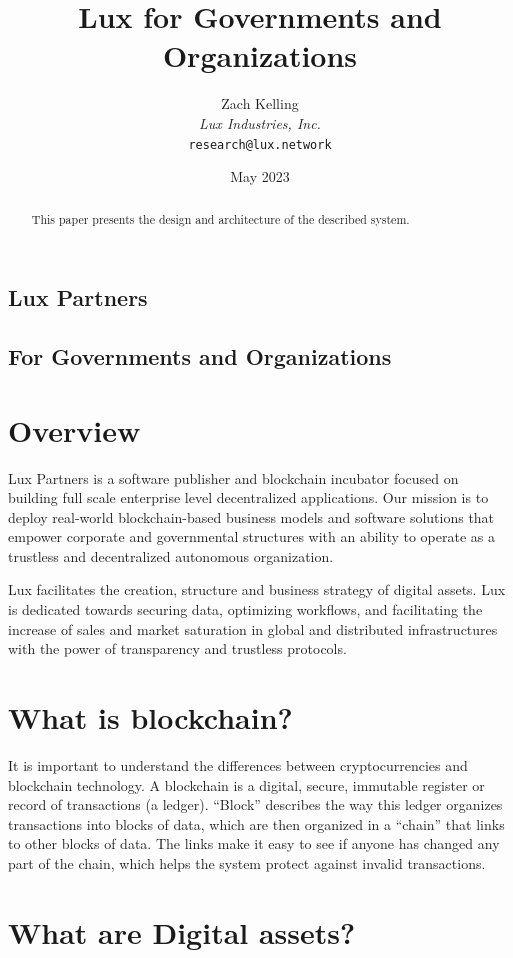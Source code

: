 \documentclass[11pt]{article}
\title{Lux for Governments and Organizations}
\author{Zach Kelling\\\textit{Lux Industries, Inc.}\\\texttt{research@lux.network}}
\date{May 2023}
\begin{document}
\luxcoverpage

\begin{abstract}
This paper presents the design and architecture of the described system.
\end{abstract}

\tableofcontents
\newpage


\subsection{Lux Partners}

\subsection{For Governments and Organizations}

\section{Overview}

Lux Partners is a software publisher and blockchain incubator focused on building full scale enterprise level decentralized applications. Our mission is to deploy real-world blockchain-based business models and software solutions that empower corporate and governmental structures with an ability to operate as a trustless and decentralized autonomous organization.


Lux facilitates the creation, structure and business strategy of digital assets. Lux  is dedicated towards securing data, optimizing workflows, and facilitating the increase of sales and market saturation in global and distributed infrastructures with the power of transparency and trustless protocols.


\section{What is blockchain?}

It is important to understand the differences between cryptocurrencies and blockchain technology. A blockchain is a digital, secure, immutable register or record of transactions (a ledger). ``Block'' describes the way this ledger organizes transactions into blocks of data, which are then organized in a ``chain'' that links to other blocks of data. The links make it easy to see if anyone has changed any part of the chain, which helps the system protect against invalid transactions.


\section{What are Digital assets?}
\end{document}
